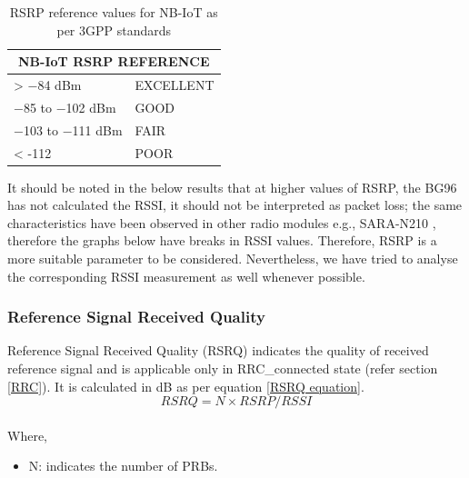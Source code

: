 \documentclass[12pt]{article}
\begin{document}
\begin{table}[h]
\caption {RSRP reference values for NB-IoT as per 3GPP standards \cite{3GPP,sikora2019performance}}
\centering

\begin{tabular}{|p{5cm}|p{5cm}|}
\hline
\multicolumn{2}{|c|}{NB-IoT RSRP REFERENCE} \\ \hline
> −84 dBm                            & EXCELLENT                    \\ \hline
−85 to −102 dBm                      & GOOD                         \\ \hline
−103 to −111 dBm                     & FAIR                         \\ \hline
< -112                               & POOR                         \\ \hline
\end{tabular}
\label{nbiotRSRP}
\end{table}




It should be noted in the below results that at higher values of RSRP, the BG96 has not calculated the RSSI, it should not be interpreted as packet loss; the same characteristics have been observed in other radio modules e.g., SARA-N210 \cite{basu2019experimental}, therefore the graphs below have breaks in RSSI values. Therefore, RSRP is a more suitable parameter to be considered. Nevertheless, we have tried to analyse the corresponding RSSI measurement as well whenever possible.

\subsubsection{Reference Signal Received Quality}\label{rsrq}
Reference Signal Received Quality (RSRQ) indicates the quality of received reference signal and is applicable only in RRC\_connected state (refer section \ref{RRC}). It is calculated in dB as per equation \ref{RSRQ equation}. 
\begin{equation}
     RSRQ= {{N\times} RSRP/ RSSI}
     \label{RSRQ equation}
\end{equation}
\\ Where,
\begin{itemize}
    \item N: indicates the number of PRBs.
\end{itemize}
\end{document}

